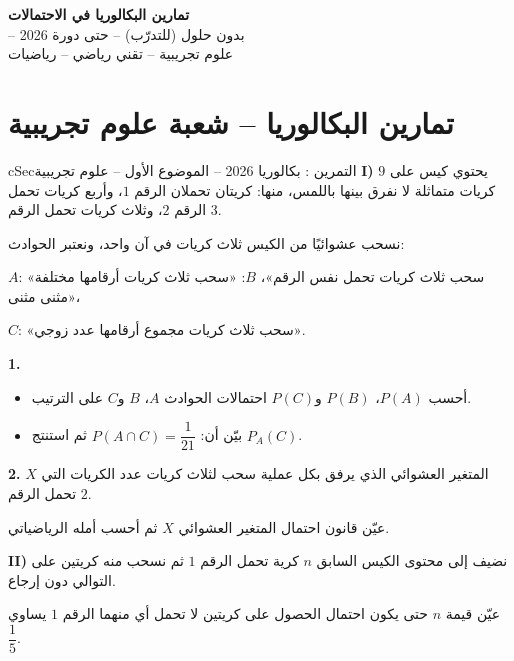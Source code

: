 \documentclass[12pt,a4paper]{article}
\newenvironment{BOX}[2]{\begin{otherlanguage}{english}\begin{arbox}{#1}{#2}}{\end{arbox}\end{otherlanguage}}
\newcounter{exo}
\newenvironment{tamrin}[1]{\stepcounter{exo}\begin{BOX}{cSec}{التمرين \theexo: #1}}{\end{BOX}}
\newenvironment{LTR}{\begin{otherlanguage}{english}}{\end{otherlanguage}}
\newenvironment{sq}{\begin{itemize}[leftmargin=2.4em,itemsep=3pt]}{\end{itemize}}
\newcommand{\qa}{\item[(أ)]}\newcommand{\qb}{\item[(ب)]}\newcommand{\qc}{\item[(جـ)]}\newcommand{\qd}{\item[(د)]}\newcommand{\qe}{\item[(هـ)]}
\newcommand{\QQ}[1]{\par\smallskip\textbf{#1.} }
\begin{document}
\begin{LTR}
\begin{tcolorbox}[enhanced,colback=cSec,colframe=cSec,arc=3mm,halign=center,boxrule=0pt,top=12pt,bottom=12pt,before upper={\selectlanguage{arabic}}]
{\color{white}\fontsize{26}{32}\selectfont\bfseries تمارين البكالوريا في الاحتمالات}\\[8pt]
{\color{white}\large -- بدون حلول (للتدرّب) -- حتى دورة 2026}\\[5pt]
{\color{white}\large علوم تجريبية -- تقني رياضي -- رياضيات}
\end{tcolorbox}
\end{LTR}
\section{تمارين البكالوريا -- شعبة علوم تجريبية}

\begin{tamrin}{بكالوريا 2026 -- الموضوع الأول -- علوم تجريبية}
\textbf{I)} يحتوي كيس على $9$ كريات متماثلة لا نفرق بينها باللمس، منها: كريتان تحملان الرقم $1$، وأربع كريات تحمل الرقم $2$، وثلاث كريات تحمل الرقم $3$.

نسحب عشوائيًا من الكيس ثلاث كريات في آن واحد، ونعتبر الحوادث:

$A$: «سحب ثلاث كريات تحمل نفس الرقم»، \quad $B$: «سحب ثلاث كريات أرقامها مختلفة مثنى مثنى»،

$C$: «سحب ثلاث كريات مجموع أرقامها عدد زوجي».

\QQ{1}
\begin{sq}
\qa أحسب $P(A)$، $P(B)$ و$P(C)$ احتمالات الحوادث $A$، $B$ و$C$ على الترتيب.
\qb بيّن أن: $P(A\cap C)=\dfrac{1}{21}$ ثم استنتج $P_A(C)$.
\end{sq}
\QQ{2} $X$ المتغير العشوائي الذي يرفق بكل عملية سحب لثلاث كريات عدد الكريات التي تحمل الرقم $2$.

عيّن قانون احتمال المتغير العشوائي $X$ ثم أحسب أمله الرياضياتي.

\textbf{II)} نضيف إلى محتوى الكيس السابق $n$ كرية تحمل الرقم $1$ ثم نسحب منه كريتين على التوالي دون إرجاع.

عيّن قيمة $n$ حتى يكون احتمال الحصول على كريتين لا تحمل أي منهما الرقم $1$ يساوي $\dfrac{1}{5}$.
\end{tamrin}
\end{document}
